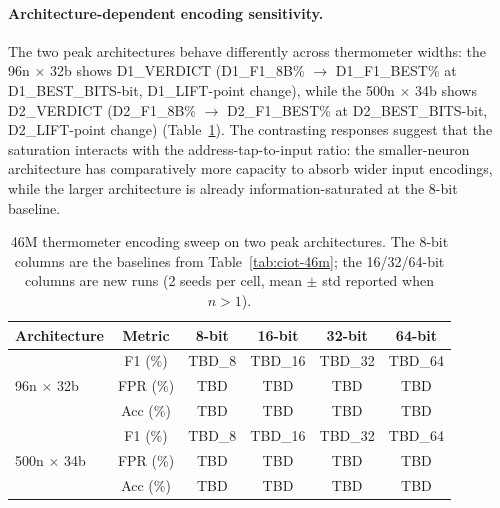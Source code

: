 \paragraph{Architecture-dependent encoding sensitivity.}
The two peak architectures behave differently across thermometer
widths: the 96n $\times$ 32b shows D1\_VERDICT (D1\_F1\_8B\% $\to$
D1\_F1\_BEST\% at D1\_BEST\_BITS-bit, D1\_LIFT-point change), while
the 500n $\times$ 34b shows D2\_VERDICT (D2\_F1\_8B\% $\to$
D2\_F1\_BEST\% at D2\_BEST\_BITS-bit, D2\_LIFT-point change)
(Table~\ref{tab:thermo-sweep}). The contrasting responses suggest
that the saturation interacts with the address-tap-to-input ratio:
the smaller-neuron architecture has comparatively more capacity to
absorb wider input encodings, while the larger architecture is
already information-saturated at the 8-bit baseline.


\begin{table}[ht!]
\centering
\caption{46M thermometer encoding sweep on two peak architectures.
The 8-bit columns are the baselines from Table~\ref{tab:ciot-46m};
the 16/32/64-bit columns are new runs (2 seeds per cell, mean
$\pm$ std reported when $n>1$).}
\label{tab:thermo-sweep}
\begin{tabular}{lccccc}
\toprule
Architecture & Metric & 8-bit & 16-bit & 32-bit & 64-bit \\
\midrule
\multirow{3}{*}{96n $\times$ 32b}
 & F1 (\%)   & TBD\_8 & TBD\_16 & TBD\_32 & TBD\_64 \\
 & FPR (\%)  & TBD    & TBD     & TBD     & TBD     \\
 & Acc (\%)  & TBD    & TBD     & TBD     & TBD     \\
\midrule
\multirow{3}{*}{500n $\times$ 34b}
 & F1 (\%)   & TBD\_8 & TBD\_16 & TBD\_32 & TBD\_64 \\
 & FPR (\%)  & TBD    & TBD     & TBD     & TBD     \\
 & Acc (\%)  & TBD    & TBD     & TBD     & TBD     \\
\bottomrule
\end{tabular}
\end{table}
